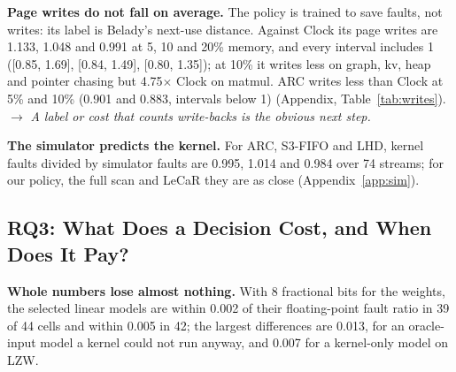 \documentclass{article}
\newcommand{\clock}{Clock\xspace}
\newcommand{\belady}{Belady\xspace}
\newcommand{\finding}[1]{\textbf{#1}\hspace{0.4em}}
\begin{document}
\finding{Page writes do not fall on average.} The policy is trained to save faults, not
writes: its label is \belady's next-use distance. Against \clock its page writes are
1.133, 1.048 and 0.991 at 5, 10 and 20\% memory, and every interval includes 1 ([0.85,
1.69], [0.84, 1.49], [0.80, 1.35]); at 10\% it writes less on graph, kv, heap and pointer
chasing but 4.75$\times$ \clock on matmul. ARC writes less than \clock at 5\% and 10\%
(0.901 and 0.883, intervals below 1) (Appendix, Table~\ref{tab:writes}).
$\rightarrow$ \emph{A label or cost that counts write-backs is the obvious next step.}

\finding{The simulator predicts the kernel.} For ARC, S3-FIFO and LHD, kernel faults
divided by simulator faults are 0.995, 1.014 and 0.984 over 74 streams; for our policy,
the full scan and LeCaR they are as close (Appendix~\ref{app:sim}).

\subsection{RQ3: What Does a Decision Cost, and When Does It Pay?}
\label{sec:eval-cost}


\finding{Whole numbers lose almost nothing.} With 8 fractional bits for the weights, the
selected linear models are within 0.002 of their floating-point fault ratio in 39 of 44
cells and within 0.005 in 42; the largest differences are 0.013, for an oracle-input model
a kernel could not run anyway, and 0.007 for a kernel-only model on LZW.
\end{document}
